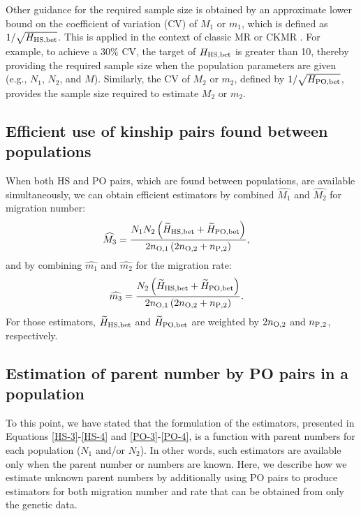 \documentclass[12pt, English]{article}
\begin{document}
\begin{spacing}{1.9}
Other guidance for the required sample size is obtained by an approximate lower bound on the coefficient of variation (CV) of $M_1$ or $m_1$, which is defined as $1/\sqrt{H_{\rm HS, bet}}$. This is applied in the context of classic MR \cite[]{seber1982estimation} or CKMR \cite[]{bravington2016close}. For example, to achieve a 30\% CV, the target of $H_{\rm HS, bet}$ is greater than 10, thereby providing the required sample size when the population parameters are given (e.g., $N_1$, $N_2$, and $M$). Similarly, the CV of $M_2$ or $m_2$, defined by $1/\sqrt{H_{\rm PO, bet}}$, provides the sample size required to estimate $M_2$ or $m_2$. 

\subsection{Efficient use of kinship pairs found between populations}

When both HS and PO pairs, which are found between populations, are available simultaneously, we can obtain efficient estimators by combined $\widehat{M_1}$ and $\widehat{M_2}$ for migration number: 
\begin{align}
\widehat{M_3} &= \frac{ N_{1} N_{2} \left(\widetilde{H}_{\rm HS,bet} + \widetilde{H}_{\rm PO,bet}\right) } {2n_{\rm O, 1} \left(2 n_{\rm O, 2} + n_{\rm P, 2}\right) },
\label{AP-1}
\end{align}
and by combining $\widehat{m_1}$ and $\widehat{m_2}$ for the migration rate: 
\begin{align}
\widehat{m_3} &= \frac{ N_{2} \left(\widetilde{H}_{\rm HS,bet} + \widetilde{H}_{\rm PO,bet}\right) } {2n_{\rm O, 1} \left(2 n_{\rm O, 2} + n_{\rm P, 2}\right)}.
\label{AP-2}
\end{align}
For those estimators, $\widetilde{H}_{\rm HS,bet}$ and $\widetilde{H}_{\rm PO,bet}$ are weighted by $2n_{\rm O, 2}$ and $n_{\rm P, 2}$, respectively. 

\subsection{Estimation of parent number by PO pairs in a population}

To this point, we have stated that the formulation of the estimators, presented in Equations \ref{HS-3}-\ref{HS-4} and \ref{PO-3}-\ref{PO-4}, is a function with parent numbers for each population ($N_1$ and/or $N_2$). In other words, such estimators are available only when the parent number or numbers are known. Here, we describe how we estimate unknown parent numbers by additionally using PO pairs to produce estimators for both migration number and rate that can be obtained from only the genetic data. 


\end{spacing}
\end{document}
